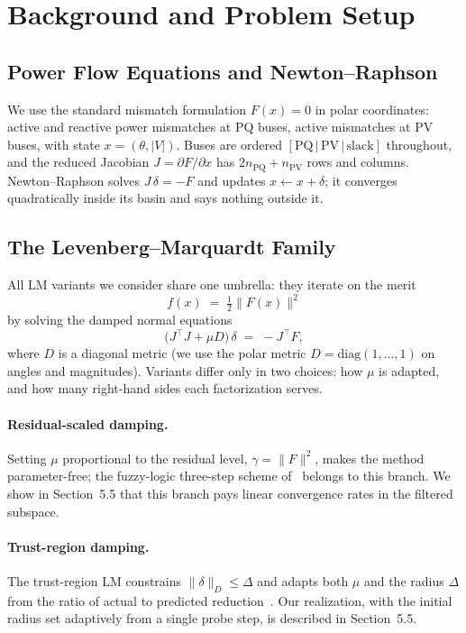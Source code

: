 \documentclass[11pt]{article}
\begin{document}
\section{Background and Problem Setup}

\subsection{Power Flow Equations and Newton--Raphson}

We use the standard mismatch formulation $F(x) = 0$ in polar coordinates:
active and reactive power mismatches at PQ buses, active mismatches at PV
buses, with state $x = (\theta, |V|)$. Buses are ordered
$[\mathrm{PQ} \,|\, \mathrm{PV} \,|\, \mathrm{slack}]$ throughout, and the
reduced Jacobian $J = \partial F / \partial x$ has $2n_{\mathrm{PQ}} +
n_{\mathrm{PV}}$ rows and columns. Newton--Raphson solves
$J\,\delta = -F$ and updates $x \leftarrow x + \delta$; it converges
quadratically inside its basin and says nothing outside it.

\subsection{The Levenberg--Marquardt Family}

All LM variants we consider share one umbrella: they iterate on the merit
\begin{equation}
  f(x) \;=\; \tfrac12 \|F(x)\|^2
\end{equation}
by solving the damped normal equations
\begin{equation}
  \bigl(J^{\top} J + \mu D\bigr)\,\delta \;=\; -J^{\top} F,
  \label{eq:lm}
\end{equation}
where $D$ is a diagonal metric (we use the polar metric
$D = \mathrm{diag}(1,\dots,1)$ on angles and magnitudes). Variants differ
only in two choices: how $\mu$ is adapted, and how many right-hand sides
each factorization serves.

\paragraph{Residual-scaled damping.} Setting $\mu$ proportional to the
residual level, $\gamma = \|F\|^2$, makes the method parameter-free; the
fuzzy-logic three-step scheme of~\cite{derakhshandeh2018} belongs to this
branch. We show in Section~5.5 that this branch pays linear convergence
rates in the filtered subspace.

\paragraph{Trust-region damping.} The trust-region LM constrains
$\|\delta\|_D \le \Delta$ and adapts both $\mu$ and the radius $\Delta$ from
the ratio of actual to predicted reduction~\cite{nocedal2006}. Our
realization, with the initial radius set adaptively from a single probe
step, is described in Section~5.5.
\end{document}
